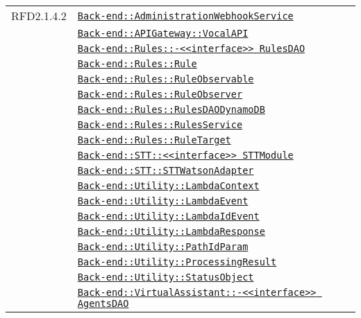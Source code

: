 \begin{longtable}{|>{\centering}m{3cm}|m{10cm}<{\centering}|}
RFD2.1.4.2 & \hyperref[Back-end::AdministrationWebhookService]{\texttt{Back-end::AdministrationWebhookService}}\\
& \hyperref[Back-end::APIGateway::VocalAPI]{\texttt{Back-end::APIGateway::VocalAPI}}\\
& \hyperref[Back-end::Rules::<<interface>> RulesDAO]{\texttt{Back-end::Rules::-\linebreak <<interface>> RulesDAO}}\\
& \hyperref[Back-end::Rules::Rule]{\texttt{Back-end::Rules::Rule}}\\
& \hyperref[Back-end::Rules::RuleObservable]{\texttt{Back-end::Rules::RuleObservable}}\\
& \hyperref[Back-end::Rules::RuleObserver]{\texttt{Back-end::Rules::RuleObserver}}\\
& \hyperref[Back-end::Rules::RulesDAODynamoDB]{\texttt{Back-end::Rules::RulesDAODynamoDB}}\\
& \hyperref[Back-end::Rules::RulesService]{\texttt{Back-end::Rules::RulesService}}\\
& \hyperref[Back-end::Rules::RuleTarget]{\texttt{Back-end::Rules::RuleTarget}}\\
& \hyperref[Back-end::STT::<<interface>> STTModule]{\texttt{Back-end::STT::<<interface>> STTModule}}\\
& \hyperref[Back-end::STT::STTWatsonAdapter]{\texttt{Back-end::STT::STTWatsonAdapter}}\\
& \hyperref[Back-end::Utility::LambdaContext]{\texttt{Back-end::Utility::LambdaContext}}\\
& \hyperref[Back-end::Utility::LambdaEvent]{\texttt{Back-end::Utility::LambdaEvent}}\\
& \hyperref[Back-end::Utility::LambdaIdEvent]{\texttt{Back-end::Utility::LambdaIdEvent}}\\
& \hyperref[Back-end::Utility::LambdaResponse]{\texttt{Back-end::Utility::LambdaResponse}}\\
& \hyperref[Back-end::Utility::PathIdParam]{\texttt{Back-end::Utility::PathIdParam}}\\
& \hyperref[Back-end::Utility::ProcessingResult]{\texttt{Back-end::Utility::ProcessingResult}}\\
& \hyperref[Back-end::Utility::StatusObject]{\texttt{Back-end::Utility::StatusObject}}\\
& \hyperref[Back-end::VirtualAssistant::<<interface>> AgentsDAO]{\texttt{Back-end::VirtualAssistant::-\linebreak <<interface>> AgentsDAO}}\\

\end{longtable}
